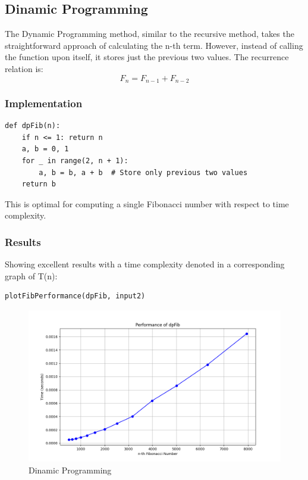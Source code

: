 \documentclass[a4paper, 12pt]{article}
\begin{document}
\subsection{Dinamic Programming}
\label{sec:orgcc4a8d9}
The Dynamic Programming method, similar to the recursive method, takes the straightforward approach of calculating the n-th term. However, instead of calling the function upon itself, it stores just the previous two values. The recurrence relation is:
\[F_n = F_{n-1} + F_{n-2}\]
\subsubsection{Implementation}
\label{sec:org27d0eab}
\begin{verbatim}
def dpFib(n):
    if n <= 1: return n
    a, b = 0, 1
    for _ in range(2, n + 1):
        a, b = b, a + b  # Store only previous two values
    return b
\end{verbatim}

This is optimal for computing a single Fibonacci number with respect to time complexity.
\subsubsection{Results}
\label{sec:orgedda308}
Showing excellent results with a time
complexity denoted in a corresponding graph of T(n):
\begin{verbatim}
plotFibPerformance(dpFib, input2)
\end{verbatim}
\begin{figure}[htbp]  %
  \centering  %
  \includegraphics[width=\textwidth]{./dinamicFib.png}  %
  \caption{Dinamic Programming}  %
\end{figure}
\end{document}
